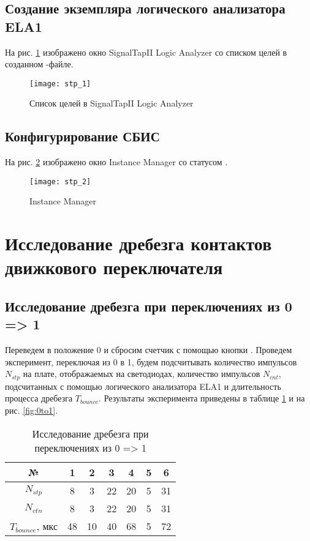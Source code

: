 \subsection{Создание экземпляра логического анализатора ELA1}

На рис. \ref{fig:stp_1} изображено окно SignalTapII Logic Analyzer со списком целей в созданном -файле.
\vspace{-0.5cm}
\begin{figure}[H]
	\begin{center}
		\texttt{[image: stp\_1]}
		\caption{Список целей в SignalTapII Logic Analyzer}
		\label{fig:stp_1}
	\end{center}
\end{figure}

\subsection{Конфигурирование СБИС}

На рис. \ref{fig:stp_2} изображено окно Instance Manager со статусом .
\vspace{-0.5cm}
\begin{figure}[H]
	\begin{center}
		\texttt{[image: stp\_2]}
		\caption{Instance Manager}
		\label{fig:stp_2}
	\end{center}
\end{figure}

\section{Исследование дребезга контактов движкового переключателя}

\subsection{Исследование дребезга при переключениях из 0 => 1}

Переведем  в положение 0 и сбросим счетчик с помощью кнопки . Проведем эксперимент, переключая  из 0 в 1, будем подсчитывать количество импульсов $N_{stp}$ на плате, отображаемых на светодиодах, количество импульсов $N_{cnt}$, подсчитанных с помощью логического анализатора ELA1 и длительность процесса дребезга $T_{bounce}$. Результаты эксперимента приведены в таблице \ref{tab:0to1} и на рис. \ref{fig:0to1}.

\begin{table}[H]
	\def\tabcolsep{20pt}
	\centering
	\caption{Исследование дребезга при переключениях из 0 => 1}
	\label{tab:0to1}
	\begin{tabular}{|c|c|c|c|c|c|c|}
		\hline
		№ & 1 & 2 & 3 & 4 & 5 & 6 \\ \hline
		$N_{stp}$ & 8 & 3 & 22 & 20 & 5 & 31 \\ \hline
		$N_{ctn}$ & 8 & 3 & 22 & 20 & 5 & 31 \\ \hline
		$T_{bounce}$, мкс & 48 & 10 & 40 & 68 & 5 & 72 \\ \hline
	\end{tabular}
\end{table}

